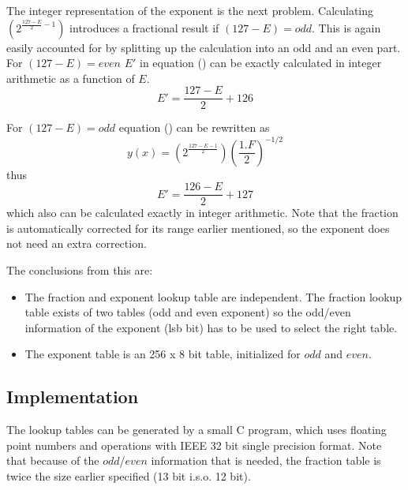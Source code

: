 The integer representation of the exponent is the next problem. Calculating
$(2^{\frac{127-E}{2}-1})$ introduces a fractional result if $(127-E) = odd$.
This is again easily accounted for by splitting up the calculation into an
odd and an even part. For $(127-E) = even$ $E'$ in equation ()
can be exactly calculated in integer arithmetic as a function of $E$.
\begin{equation}
E' = \frac{127-E}{2} + 126
\end{equation}

For $(127-E) = odd$ equation () can be rewritten as
\begin{equation}
y(x) = (2^{\frac{127-E-1}{2}})(\frac{1.F}{2})^{-1/2}
\end{equation}
thus
\begin{equation}
E' = \frac{126-E}{2} + 127
\end{equation}
which also can be calculated exactly in integer arithmetic.
Note that the fraction is automatically corrected for its range earlier
mentioned, so the exponent does not need an extra correction.

The conclusions from this are:
\begin{itemize}
\item The fraction and exponent lookup table are independent. The fraction
lookup table exists of two tables (odd and even exponent) so the odd/even
information of the exponent (lsb bit) has to be used to select the right
table.
\item The exponent table is an 256 x 8 bit table, initialized for $odd$
and $even$.%
\end{itemize}

\subsection{Implementation}
The lookup tables can be generated by a small C program, which uses
floating point numbers and operations with IEEE 32 bit single precision format.
Note that because of the $odd$/$even$ information that is needed, the
fraction table is twice the size earlier specified (13 bit i.s.o. 12 bit).

